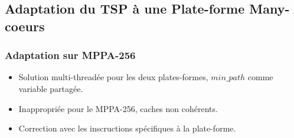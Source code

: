 \documentclass[10pt]{beamer}
\newcommand{\mppa}{{\small \textsf{MPPA-256}}\xspace}
\begin{document}
\subsection[Adaptation à un many-c\oe urs]{Adaptation du TSP à une Plate-forme Many-coeurs}
\begin{frame}
\frametitle{Adaptation sur \mppa}
 \begin{itemize}
  \item Solution multi-threadée pour les deux plates-formes, $min\_path$ comme variable partagée.
  \item Inappropriée pour le \mppa, caches non cohérents.
  \item Correction avec les inscructions spécifiques à la plate-forme.
 \end{itemize}
\end{frame}
\end{document}
